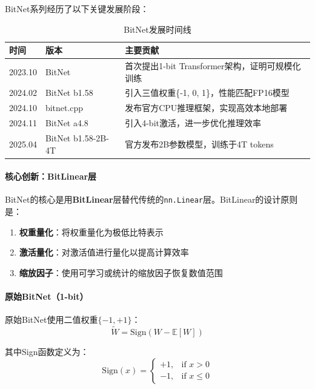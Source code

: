 \documentclass[12pt,a4paper]{article}
\begin{document}
BitNet系列经历了以下关键发展阶段：

\begin{table}[H]
\centering
\caption{BitNet发展时间线}
\begin{tabular}{llp{9cm}}
\toprule
\textbf{时间} & \textbf{版本} & \textbf{主要贡献} \\
\midrule
2023.10 & BitNet & 首次提出1-bit Transformer架构，证明可规模化训练 \\
2024.02 & BitNet b1.58 & 引入三值权重\{-1, 0, 1\}，性能匹配FP16模型 \\
2024.10 & bitnet.cpp & 发布官方CPU推理框架，实现高效本地部署 \\
2024.11 & BitNet a4.8 & 引入4-bit激活，进一步优化推理效率 \\
2025.04 & BitNet b1.58-2B-4T & 官方发布2B参数模型，训练于4T tokens \\
\bottomrule
\end{tabular}
\end{table}

\paragraph{核心创新：BitLinear层}

BitNet的核心是用\textbf{BitLinear}层替代传统的\texttt{nn.Linear}层。BitLinear的设计原则是：

\begin{enumerate}
    \item \textbf{权重量化}：将权重量化为极低比特表示
    \item \textbf{激活量化}：对激活值进行量化以提高计算效率
    \item \textbf{缩放因子}：使用可学习或统计的缩放因子恢复数值范围
\end{enumerate}

\paragraph{原始BitNet（1-bit）}

原始BitNet使用二值权重$\{-1, +1\}$：
\begin{equation}
\tilde{W} = \text{Sign}(W - \mathbb{E}[W])
\end{equation}

其中Sign函数定义为：
\begin{equation}
\text{Sign}(x) = \begin{cases}
+1, & \text{if } x > 0 \\
-1, & \text{if } x \leq 0
\end{cases}
\end{equation}
\end{document}
